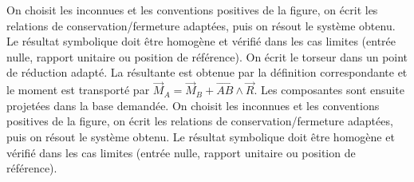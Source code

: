 \begin{corrigebox}
On choisit les inconnues et les conventions positives de la figure,
        on écrit les relations de conservation/fermeture adaptées, puis on résout le
        système obtenu. Le résultat symbolique doit être homogène et vérifié dans les cas
        limites (entrée nulle, rapport unitaire ou position de référence).
On écrit le torseur dans un point de réduction adapté. La résultante
        est obtenue par la définition correspondante et le moment est transporté par
        $\vec M_A=\vec M_B+\overrightarrow{AB}\wedge\vec R$. Les composantes sont ensuite
        projetées dans la base demandée.
On choisit les inconnues et les conventions positives de la figure,
        on écrit les relations de conservation/fermeture adaptées, puis on résout le
        système obtenu. Le résultat symbolique doit être homogène et vérifié dans les cas
        limites (entrée nulle, rapport unitaire ou position de référence).
\end{corrigebox}
